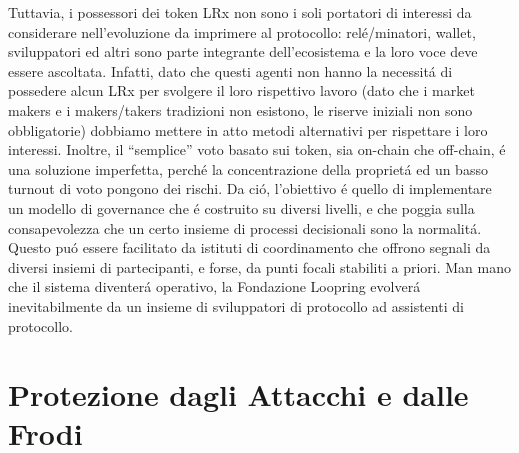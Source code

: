 \documentclass[UTF8,nofonts]{article}
\begin{document}
\begin{multicols}{2}
Tuttavia, i possessori dei token LRx non sono i soli portatori di interessi da considerare nell'evoluzione da imprimere al protocollo: rel\'e/minatori, wallet, sviluppatori ed altri sono parte integrante dell'ecosistema e la loro voce deve essere ascoltata. Infatti, dato che questi agenti non hanno la necessit\'a di possedere alcun LRx per svolgere il loro rispettivo lavoro (dato che i market makers e i makers/takers tradizioni non esistono, le riserve iniziali non sono obbligatorie) dobbiamo mettere in atto metodi alternativi per rispettare i loro interessi.  Inoltre, il “semplice” voto basato sui token, sia on-chain che off-chain, \'e una soluzione imperfetta, perch\'e la concentrazione della propriet\'a ed un basso turnout di voto pongono dei rischi. Da ci\'o, l'obiettivo \'e quello di implementare un modello di governance che \'e costruito su diversi livelli, e che poggia sulla consapevolezza che un certo insieme di processi decisionali sono la normalit\'a. Questo pu\'o essere facilitato da istituti di coordinamento che offrono segnali da diversi insiemi di partecipanti, e forse, da punti focali stabiliti a priori. Man mano che il sistema diventer\'a operativo, la Fondazione Loopring evolver\'a inevitabilmente da un insieme di sviluppatori di protocollo ad assistenti di protocollo.

\section{Protezione dagli Attacchi e dalle Frodi}

\end{multicols}
\end{document}
